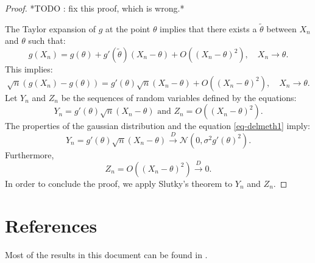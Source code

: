 \documentclass{article}
\begin{document}
\begin{proof}
*TODO : fix this proof, which is wrong.*

The Taylor expansion of $g$ at the point $\theta$ implies that there exists a $\tilde{\theta}$ between 
$X_n$ and $\theta$ such that:
$$
g(X_n) = g(\theta) + g'(\tilde{\theta})(X_n-\theta) + O((X_n-\theta)^2), \quad X_n \rightarrow \theta.
$$
This implies:
$$
\sqrt{n} (g(X_n) - g(\theta)) = g'(\theta) \sqrt{n} (X_n-\theta) + O((X_n-\theta)^2), \quad X_n \rightarrow \theta.
$$
Let $Y_n$ and $Z_n$ be the sequences of random variables defined by the equations:
$$
Y_n = g'(\theta) \sqrt{n} (X_n-\theta) \textrm{ and } Z_n = O((X_n-\theta)^2).
$$
The properties of the gaussian distribution and the equation \ref{eq-delmeth1} imply:
$$
Y_n =g'(\theta) \sqrt{n} (X_n - \theta) \xrightarrow{D} \mathcal{N}(0,\sigma^2 g'(\theta)^2).
$$
Furthermore, 
$$
Z_n = O((X_n-\theta)^2)  \xrightarrow{D} 0.
$$
In order to conclude the proof, we apply Slutky's theorem to $Y_n$ and $Z_n$. 
\end{proof}

\section{References}

Most of the results in this document can be found in \cite{Vaart2000}.

%




\end{document}
